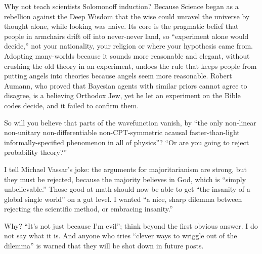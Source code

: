 Why not teach scientists Solomonoff induction? Because Science began as a rebellion against the Deep Wisdom that the wise could unravel the universe by thought alone, while looking was naive. Its core is the pragmatic belief that people in armchairs drift off into never-never land, so ``experiment alone would decide,'' not your nationality, your religion or where your hypothesis came from. Adopting many-worlds because it sounds more reasonable and elegant, without crushing the old theory in an experiment, undoes the rule that keeps people from putting angels into theories because angels seem more reasonable.  Robert Aumann, who proved that Bayesian agents with similar priors cannot agree to disagree, is a believing Orthodox Jew, yet he let an experiment on the Bible codes decide, and it failed to confirm them. 

So will you believe that parts of the wavefunction vanish, by ``the only non-linear non-unitary non-differentiable non-CPT-symmetric acausal faster-than-light informally-specified phenomenon in all of physics''? ``Or are you going to reject probability theory?'' 

I tell Michael Vassar's joke: the arguments for majoritarianism are strong, but they must be rejected, because the majority believes in God, which is ``simply unbelievable.'' Those good at math should now be able to get ``the insanity of a global single world'' on a gut level.  I wanted ``a nice, sharp dilemma between rejecting the scientific method, or embracing insanity.''

Why? ``It's not just because I'm evil''; think beyond the first obvious answer. I do not say what it is. And anyone who tries ``clever ways to wriggle out of the dilemma'' is warned that they will be shot down in future posts.
